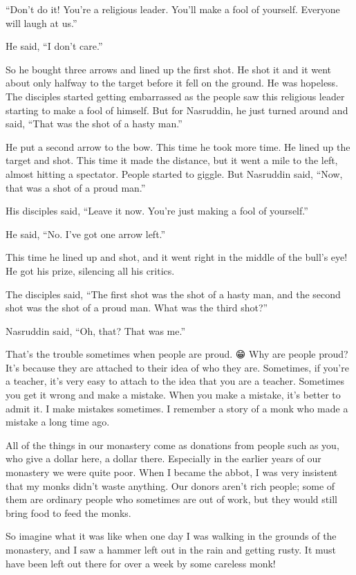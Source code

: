 \documentclass[12pt, openany]{book}
\begin{document}
“Don’t do it! You’re a religious leader. You’ll make a fool of yourself. Everyone will laugh at us.” 

He said, “I don’t care.” 

So he bought three arrows and lined up the first shot. He shot it and it went about only halfway to the target before it fell on the ground. He was hopeless. The disciples started getting embarrassed as the people saw this religious leader starting to make a fool of himself. But for Nasruddin, he just turned around and said, “That was the shot of a hasty man.” 

He put a second arrow to the bow. This time he took more time. He lined up the target and shot. This time it made the distance, but it went a mile to the left, almost hitting a spectator. People started to giggle. But Nasruddin said, “Now, that was a shot of a proud man.” 

His disciples said, “Leave it now. You’re just making a fool of yourself.” 

He said, “No. I’ve got one arrow left.” 

This time he lined up and shot, and it went right in the middle of the bull’s eye! He got his prize, silencing all his critics. 

The disciples said, “The first shot was the shot of a hasty man, and the second shot was the shot of a proud man. What was the third shot?” 

Nasruddin said, “Oh, that? That was me.” 

That’s the trouble sometimes when people are proud. 😁 Why are people proud? It’s because they are attached to their idea of who they are. Sometimes, if you’re a teacher, it’s very easy to attach to the idea that you are a teacher. Sometimes you get it wrong and make a mistake. When you make a mistake, it’s better to admit it. I make mistakes sometimes. I remember a story of a monk who made a mistake a long time ago. 

All of the things in our monastery come as donations from people such as you, who give a dollar here, a dollar there. Especially in the earlier years of our monastery we were quite poor. When I became the abbot, I was very insistent that my monks didn’t waste anything. Our donors aren’t rich people; some of them are ordinary people who sometimes are out of work, but they would still bring food to feed the monks. 

So imagine what it was like when one day I was walking in the grounds of the monastery, and I saw a hammer left out in the rain and getting rusty. It must have been left out there for over a week by some careless monk! 
\end{document}
